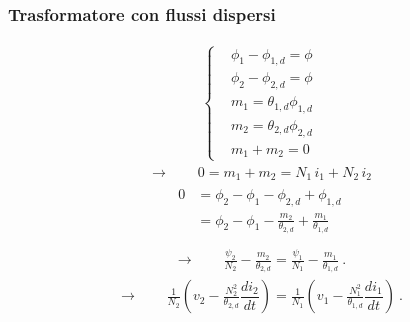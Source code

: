 \documentclass[letterpaper,10pt,english]{jupyterBook}
\begin{document}
\subsubsection{Trasformatore con flussi dispersi}
\label{\detokenize{ch/circuits-electromagnetic-transformer:trasformatore-con-flussi-dispersi}}\begin{equation*}
\begin{split}\begin{cases}
 & \phi_1 - \phi_{1,d} = \phi \\
 & \phi_2 - \phi_{2,d} = \phi \\
 & m_1 = \theta_{1,d} \phi_{1,d} \\
 & m_2 = \theta_{2,d} \phi_{2,d} \\
 & m_1 + m_2 = 0
\end{cases}\end{split}
\end{equation*}\begin{equation*}
\begin{split}\rightarrow \qquad 0 = m_1 + m_2 = N_1 \, i_1 + N_2 \, i_2\end{split}
\end{equation*}\begin{equation*}
\begin{split}\begin{aligned}
  0 & = \phi_2 - \phi_1 - \phi_{2,d} + \phi_{1,d} \\
    & = \phi_2 - \phi_1 - \frac{m_2}{\theta_{2,d}} + \frac{m_1}{\theta_{1,d}} \\
\end{aligned}\end{split}
\end{equation*}\begin{equation*}
\begin{split}\rightarrow \qquad \frac{\psi_2}{N_2} - \frac{m_2}{\theta_{2,d}} = \frac{\psi_1}{N_1} - \frac{m_1}{\theta_{1,d}} \ .\end{split}
\end{equation*}\begin{equation*}
\begin{split}\rightarrow \qquad \frac{1}{N_2} \left( v_2 - \frac{N_2^2}{\theta_{2,d}} \dfrac{d i_2}{d t} \right) =  
                     \frac{1}{N_1} \left( v_1 - \frac{N_1^2}{\theta_{1,d}} \dfrac{d i_1}{d t} \right)  \ .\end{split}
\end{equation*}
\end{document}
